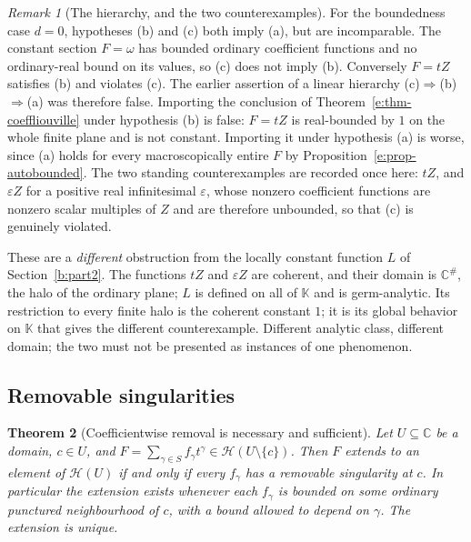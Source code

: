 \documentclass[11pt,a4paper]{article}
\numberwithin{equation}{section}
\newtheorem{theorem}{Theorem}[section]
\theoremstyle{definition}
\theoremstyle{remark}
\newtheorem{remark}[theorem]{Remark}
\theoremstyle{plain}
\newcommand{\K}{\mathbb K}
\newcommand{\CC}{\mathbb C}
\newcommand{\tm}{t}
\newcommand{\halo}[1]{#1^{\#}}
\newcommand{\Hc}{\mathcal H}
\begin{document}
\begin{remark}[The hierarchy, and the two counterexamples]
\label{e:rem-liouvillehierarchy}
For the boundedness case $d=0$, hypotheses (b) and (c) both imply (a),
but are incomparable. The constant section $F=\omega$ has bounded
ordinary coefficient functions and no ordinary-real bound on its values,
so (c) does not imply (b). Conversely $F=\tm Z$ satisfies (b) and
violates (c). The earlier assertion of a linear hierarchy
(c)$\Rightarrow$(b)$\Rightarrow$(a) was therefore false.  Importing the conclusion of
Theorem~\ref{e:thm-coeffliouville} under hypothesis (b) is false:
$F=\tm Z$ is real-bounded by $1$ on the whole finite plane and is not
constant.  Importing it under hypothesis (a) is worse, since (a) holds for
every macroscopically entire $F$ by
Proposition~\ref{e:prop-autobounded}.  The two standing counterexamples
are recorded once here: $\tm Z$, and $\varepsilon Z$ for a positive real
infinitesimal $\varepsilon$, whose nonzero coefficient functions are
nonzero scalar multiples of $Z$ and are therefore unbounded, so that (c)
is genuinely violated.

These are a \emph{different} obstruction from the locally constant
function $L$ of Section~\ref{b:part2}.  The functions $\tm Z$ and $\varepsilon Z$ are
coherent, and their domain is $\halo{\CC}$, the halo of the ordinary
plane; $L$ is defined on all of $\K$ and is germ-analytic. Its restriction
to every finite halo is the coherent constant $1$; it is its global
behavior on $\K$ that gives the different counterexample.  Different analytic class, different domain; the
two must not be presented as instances of one phenomenon.
\end{remark}

\subsection{Removable singularities}\label{e:sec-removable}

\begin{theorem}[Coefficientwise removal is necessary and sufficient]
\label{e:thm-removable}
Let $U\subseteq\CC$ be a domain, $c\in U$, and
$F=\sum_{\gamma\in S}f_\gamma\tm^\gamma\in\Hc(U\setminus\{c\})$.  Then $F$
extends to an element of $\Hc(U)$ if and only if every $f_\gamma$ has a
removable singularity at $c$.  In particular the extension exists whenever
each $f_\gamma$ is bounded on some ordinary punctured neighbourhood of
$c$, with a bound allowed to depend on $\gamma$.  The extension is unique.
\end{theorem}
\end{document}
